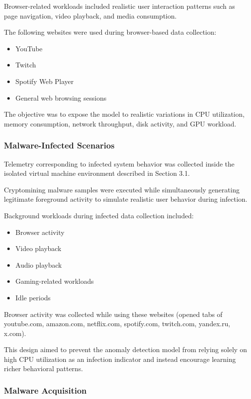 \documentclass[a4paper,12pt]{extarticle}
\begin{document}
Browser-related workloads included realistic user interaction patterns such as page navigation, video playback, and media consumption.

The following websites were used during browser-based data collection:

\begin{itemize}
    \item YouTube
    \item Twitch
    \item Spotify Web Player
    \item General web browsing sessions
\end{itemize}

The objective was to expose the model to realistic variations in CPU utilization, memory consumption, network throughput, disk activity, and GPU workload.

\subsubsection{Malware-Infected Scenarios}

Telemetry corresponding to infected system behavior was collected inside the isolated virtual machine environment described in Section 3.1.

Cryptomining malware samples were executed while simultaneously generating legitimate foreground activity to simulate realistic user behavior during infection.

Background workloads during infected data collection included:

\begin{itemize}
    \item Browser activity  
    \item Video playback
    \item Audio playback
    \item Gaming-related workloads
    \item Idle periods
\end{itemize}

Browser activity was collected while using these websites (opened tabs of youtube.com, amazon.com, netflix.com, spotify.com, twitch.com, yandex.ru, x.com).

This design aimed to prevent the anomaly detection model from relying solely on high CPU utilization as an infection indicator and instead encourage learning richer behavioral patterns.

\subsubsection{Malware Acquisition}
\end{document}
